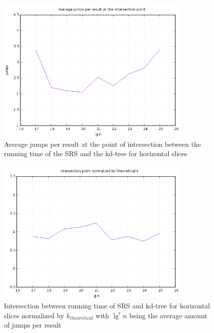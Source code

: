 \begin{figure}[h]
    \centering
    \includegraphics[width = 0.85\textwidth]{pictures/analysis/hori_jumps_per_lgn.png}
    \caption{Average jumps per result at the point of intersection between the running time of the SRS and the kd-tree for horizontal slices}\label{fig:hori_jumps_per_lgn}
\end{figure}


\begin{figure}[h]
    \centering
    \includegraphics[width = 0.85\textwidth]{pictures/analysis/hori_theory.png}
    \caption{Intersection between running time of SRS and kd-tree for horizontal slices normalized by $k_{theoretical}$ with $\lg^\epsilon n$ being the average amount of jumps per result}\label{fig:hori_theory}
\end{figure}


